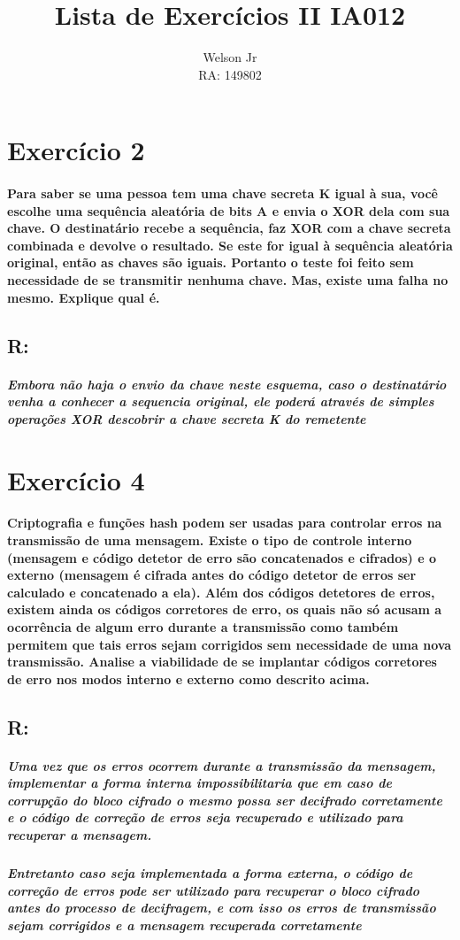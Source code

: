 \documentclass[10pt,a4paper]{report}
\author{Welson Jr \\ RA: 149802}
\title{Lista de Exercícios II IA012}
\begin{document}
\maketitle
\section*{Exercício 2}
\paragraph{Para saber se uma pessoa tem uma chave secreta K igual à sua, você escolhe uma sequência aleatória de bits A e envia o XOR dela com sua chave. O destinatário recebe a sequência, faz XOR com a chave secreta combinada e devolve o resultado. Se este for igual à sequência aleatória original, então as chaves são iguais. Portanto o teste foi feito sem necessidade de se transmitir nenhuma chave. Mas, existe uma falha no mesmo. Explique qual é.}
\subsection*{R:}
\subparagraph{Embora não haja o envio da chave neste esquema, caso o destinatário venha a conhecer a sequencia original, ele poderá através de simples operações XOR descobrir a chave secreta K do remetente}

\section*{Exercício 4}
\paragraph{ Criptografia e funções hash podem ser usadas para controlar erros na transmissão de uma mensagem. Existe o tipo de controle interno (mensagem e código detetor de erro são concatenados e cifrados) e o externo (mensagem é cifrada antes do código detetor de erros ser calculado e concatenado a ela). Além dos códigos detetores de erros, existem ainda os códigos corretores de erro, os quais não só acusam a ocorrência de algum erro durante a transmissão como também permitem que tais erros sejam corrigidos sem necessidade de uma nova transmissão. Analise a viabilidade de se implantar códigos corretores de erro nos modos interno e externo como descrito acima.}
\subsection*{R:}
\subparagraph{Uma vez que os erros ocorrem durante a transmissão da mensagem, implementar a forma interna impossibilitaria que em caso de corrupção do  bloco cifrado o mesmo possa ser decifrado corretamente e o código de correção de erros seja recuperado e utilizado para recuperar a mensagem.}
\subparagraph{Entretanto caso seja implementada a forma externa, o código de correção de erros pode ser utilizado para recuperar o bloco cifrado antes do processo de decifragem, e com isso os erros de transmissão sejam corrigidos e a mensagem recuperada corretamente}
\end{document}

